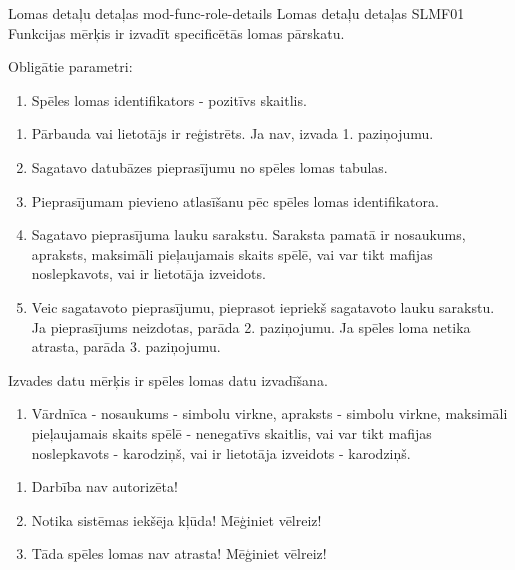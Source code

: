 \moduleFunctionTable
{Lomas detaļu detaļas}
{mod-func-role-details}
{Lomas detaļu detaļas}
{SLMF01}
{
	Funkcijas mērķis ir izvadīt specificētās lomas pārskatu.
}
{
	Obligātie parametri:
	\begin{enumerate}
		\item Spēles lomas identifikators - pozitīvs skaitlis.
	\end{enumerate}
}
{
	\begin{enumerate}
		\item Pārbauda vai lietotājs ir reģistrēts.
		      Ja nav, izvada 1. paziņojumu.
		\item Sagatavo datubāzes pieprasījumu no spēles lomas tabulas.
		\item Pieprasījumam pievieno atlasīšanu pēc spēles lomas identifikatora.
		\item Sagatavo pieprasījuma lauku sarakstu.
		      Saraksta pamatā ir nosaukums, apraksts, maksimāli pieļaujamais skaits spēlē, vai var tikt mafijas noslepkavots, vai ir lietotāja izveidots.
		\item Veic sagatavoto pieprasījumu, pieprasot iepriekš sagatavoto lauku sarakstu.
		      Ja pieprasījums neizdotas, parāda 2. paziņojumu.
		      Ja spēles loma netika atrasta, parāda 3. paziņojumu.
	\end{enumerate}
}
{
	Izvades datu mērķis ir spēles lomas datu izvadīšana.
	\begin{enumerate}
		\item Vārdnīca - nosaukums - simbolu virkne, apraksts - simbolu virkne, maksimāli pieļaujamais
		      skaits spēlē - nenegatīvs skaitlis, vai var tikt mafijas noslepkavots - karodziņš, vai ir lietotāja izveidots - karodziņš.
	\end{enumerate}
}
{
	\begin{enumerate}
		\item Darbība nav autorizēta!
		\item Notika sistēmas iekšēja kļūda! Mēģiniet vēlreiz!
		\item Tāda spēles lomas nav atrasta! Mēģiniet vēlreiz!
	\end{enumerate}
}
